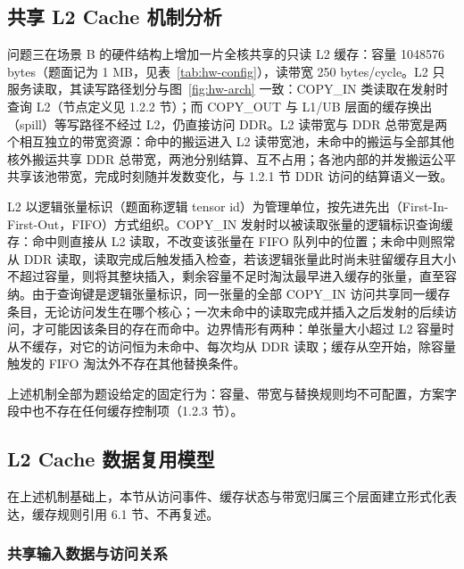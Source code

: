 \subsection{共享 L2 Cache 机制分析}

问题三在场景 B 的硬件结构上增加一片全核共享的只读 L2 缓存：容量 1048576 bytes（题面记为 1 MB，见表~\ref{tab:hw-config}），读带宽 250 bytes/cycle。L2 只服务读取，其读写路径划分与图~\ref{fig:hw-arch} 一致：COPY\_IN 类读取在发射时查询 L2（节点定义见 1.2.2 节）；而 COPY\_OUT 与 L1/UB 层面的缓存换出（spill）等写路径不经过 L2，仍直接访问 DDR。L2 读带宽与 DDR 总带宽是两个相互独立的带宽资源：命中的搬运进入 L2 读带宽池，未命中的搬运与全部其他核外搬运共享 DDR 总带宽，两池分别结算、互不占用；各池内部的并发搬运公平共享该池带宽，完成时刻随并发数变化，与 1.2.1 节 DDR 访问的结算语义一致。

L2 以逻辑张量标识（题面称逻辑 tensor id）为管理单位，按先进先出（First-In-First-Out，FIFO）方式组织。COPY\_IN 发射时以被读取张量的逻辑标识查询缓存：命中则直接从 L2 读取，不改变该张量在 FIFO 队列中的位置；未命中则照常从 DDR 读取，读取完成后触发插入检查，若该逻辑张量此时尚未驻留缓存且大小不超过容量，则将其整块插入，剩余容量不足时淘汰最早进入缓存的张量，直至容纳。由于查询键是逻辑张量标识，同一张量的全部 COPY\_IN 访问共享同一缓存条目，无论访问发生在哪个核心；一次未命中的读取完成并插入之后发射的后续访问，才可能因该条目的存在而命中。边界情形有两种：单张量大小超过 L2 容量时从不缓存，对它的访问恒为未命中、每次均从 DDR 读取；缓存从空开始，除容量触发的 FIFO 淘汰外不存在其他替换条件。

上述机制全部为题设给定的固定行为：容量、带宽与替换规则均不可配置，方案字段中也不存在任何缓存控制项（1.2.3 节）。

\subsection{L2 Cache 数据复用模型}

在上述机制基础上，本节从访问事件、缓存状态与带宽归属三个层面建立形式化表达，缓存规则引用 6.1 节、不再复述。

\subsubsection{共享输入数据与访问关系}


